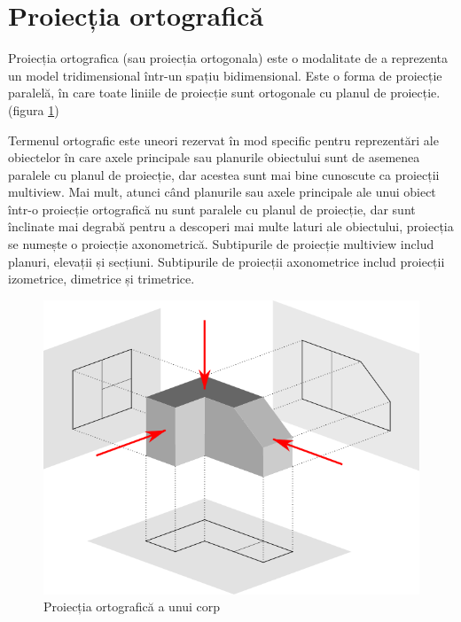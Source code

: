 \newpage
\section{Proiecția ortografică}

Proiecția ortografica (sau proiecția ortogonala) este o modalitate de a reprezenta un model tridimensional  
într-un spațiu bidimensional. Este o forma de proiecție paralelă, în care toate liniile de proiecție sunt ortogonale 
cu planul de proiecție. (figura \ref{fig:proj})\newline

Termenul ortografic este uneori rezervat în mod specific pentru reprezentări ale obiectelor în care axele principale 
sau planurile obiectului sunt de asemenea paralele cu planul de proiecție, dar acestea sunt mai bine cunoscute 
ca proiecții multiview. Mai mult, atunci când planurile sau axele principale ale unui obiect într-o proiecție 
ortografică nu sunt paralele cu planul de proiecție, dar sunt înclinate mai degrabă pentru a descoperi mai 
multe laturi ale obiectului, proiecția se numește o proiecție axonometrică. Subtipurile de proiecție multiview 
includ planuri, elevații și secțiuni. Subtipurile de proiecții axonometrice includ proiecții izometrice, dimetrice și trimetrice. \cite{ortographic2}\newline

\begin{figure}[H]
  \begin{center}
      \includegraphics[scale=0.5]{imagini/proiectie/ortografica.png}
      \caption{Proiecția ortografică a unui corp \protect\footnotemark}
      \label{fig:proj}
  \end{center}    
\end{figure}

